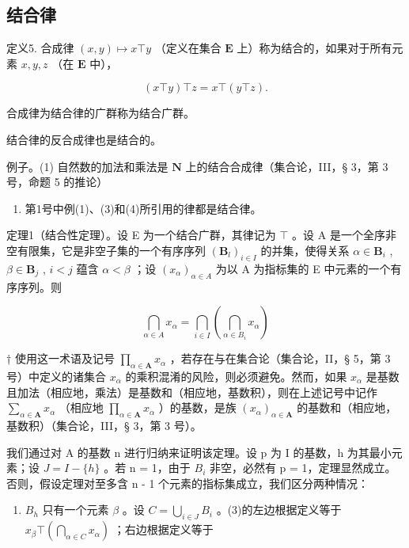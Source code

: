 \subsection{结合律}

定义5. 合成律 \((x,y)\mapsto x\top y\) （定义在集合 \(\mathbf{E}\) 上）称为结合的，如果对于所有元素 \(x,y,z\) （在 \(\mathbf{E}\) 中），

\[
(x \top y) \top z = x \top (y \top z).
\]

合成律为结合律的广群称为结合广群。

结合律的反合成律也是结合的。

例子。(1) 自然数的加法和乘法是 \(\mathbf{N}\) 上的结合合成律（集合论，III，§ 3，第 3 号，命题 5 的推论）

\begin{enumerate}
\def\labelenumi{(\arabic{enumi})}
\setcounter{enumi}{1}
\tightlist
\item
  第1号中例(1)、(3)和(4)所引用的律都是结合律。
\end{enumerate}

定理1（结合性定理）。设 E 为一个结合广群，其律记为 \(\top\) 。设 A 是一个全序非空有限集，它是非空子集的一个有序序列 \((\mathbf{B}_l)_{i \in I}\) 的并集，使得关系 \(\alpha \in \mathbf{B}_i\) , \(\beta \in \mathbf{B}_j\) , \(i < j\) 蕴含 \(\alpha < \beta\) ；设 \((x_\alpha)_{\alpha \in A}\) 为以 A 为指标集的 E 中元素的一个有序序列。则

\[
\bigcap_ {\alpha \in A} x _ {\alpha} = \bigcap_ {i \in I} \left(\bigcap_ {\alpha \in B _ {i}} x _ {\alpha}\right)\tag{3}
\]

† 使用这一术语及记号 \(\prod_{\alpha \in \mathbf{A}} x_{\alpha}\) ，若存在与在集合论（集合论，II，§ 5，第 3 号）中定义的诸集合 \(x_{\alpha}\) 的乘积混淆的风险，则必须避免。然而，如果 \(x_{\alpha}\) 是基数且加法（相应地，乘法）是基数和（相应地，基数积），则在上述记号中记作 \(\sum_{\alpha \in \mathbf{A}} x_{\alpha}\) （相应地 \(\prod_{\alpha \in \mathbf{A}} x_{\alpha}\) ）的基数，是族 \((x_{\alpha})_{\alpha \in \mathbf{A}}\) 的基数和（相应地，基数积）（集合论，III，§ 3，第 3 号）。

我们通过对 A 的基数 n 进行归纳来证明该定理。设 p 为 I 的基数，h 为其最小元素；设 \(J = I - \{h\}\) 。若 n = 1，由于 \(B_{i}\) 非空，必然有 p = 1，定理显然成立。否则，假设定理对至多含 n - 1 个元素的指标集成立，我们区分两种情况：

\begin{enumerate}
\def\labelenumi{(\alph{enumi})}
\tightlist
\item
  \(B_{h}\) 只有一个元素 \(\beta\) 。设 \(C = \bigcup_{i \in J} B_{i}\) 。(3)的左边根据定义等于 \(x_{\beta} \top \left( \bigcap_{\alpha \in C} x_{\alpha} \right)\) ；右边根据定义等于
\end{enumerate}

